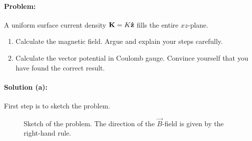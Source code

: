 \paragraph{Problem:} A uniform surface current density $\bm{\mathrm{K}} = K \bm{\mathrm{\hat{z}}}$ fills the entire $xz$-plane.
\begin{enumerate}[label=(\alph*)]
    \item Calculate the magnetic field. Argue and explain your steps carefully.
    \item  Calculate the vector potential in Coulomb gauge. Convince yourself that you have found the correct result.
\end{enumerate}

\paragraph{Solution (a):} First step is to sketch the problem.
\begin{figure}[H]
    \centering
    
    \caption{Sketch of the problem. The direction of the $\vec{B}$-field is given by the right-hand rule.}
    \label{fig:sketch}
\end{figure}

